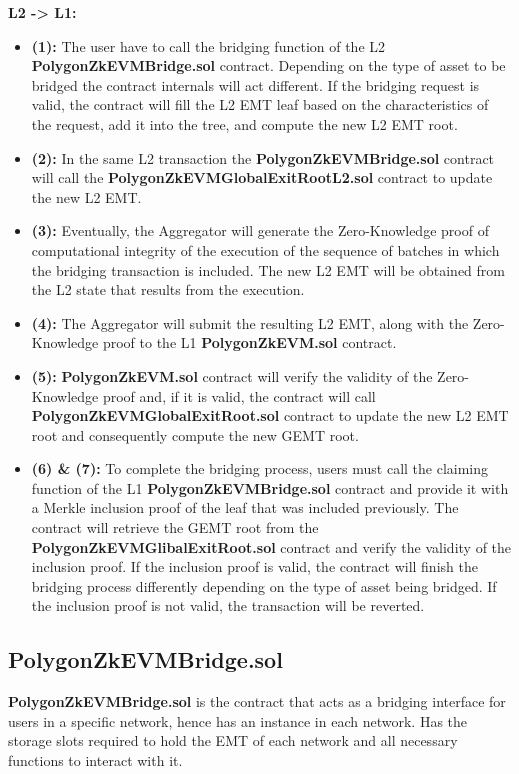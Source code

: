 \textbf{L2 -> L1:}
\begin{itemize}
	\item \textbf{(1):} The user have to call the bridging function of the L2 \textbf{PolygonZkEVMBridge.sol} contract. Depending on the type of asset to be bridged the contract internals will act different. If the bridging request is valid, the contract will fill the L2 EMT leaf based on the characteristics of the request, add it into the tree, and compute the new L2 EMT root.
	\item \textbf{(2):} In the same L2 transaction the \textbf{PolygonZkEVMBridge.sol} contract will call the \textbf{PolygonZkEVMGlobalExitRootL2.sol} contract to update the new L2 EMT.
	\item \textbf{(3):} Eventually, the Aggregator will generate the Zero-Knowledge proof of computational integrity of the execution of the sequence of batches in which the bridging transaction is included. The new L2 EMT will be obtained from the L2 state that results from the execution.
	\item \textbf{(4):} The Aggregator will submit the resulting L2 EMT, along with the Zero-Knowledge proof to the L1 \textbf{PolygonZkEVM.sol} contract.
	\item \textbf{(5):} \textbf{PolygonZkEVM.sol} contract will verify the validity of the Zero-Knowledge proof and, if it is valid, the contract will call \textbf{PolygonZkEVMGlobalExitRoot.sol} contract to update the new L2 EMT root and consequently compute the new GEMT root.
	\item \textbf{(6) \& (7):} To complete the bridging process, users must call the claiming function of the L1 \textbf{PolygonZkEVMBridge.sol} contract and provide it with a Merkle inclusion proof of the leaf that was included previously. The contract will retrieve the GEMT root from the \textbf{PolygonZkEVMGlibalExitRoot.sol} contract and verify the validity of the inclusion proof. If the inclusion proof is valid, the contract will finish the bridging process differently depending on the type of asset being bridged. If the inclusion proof is not valid, the transaction will be reverted.
\end{itemize}



\subsection{PolygonZkEVMBridge.sol}


\textbf{PolygonZkEVMBridge.sol} is the contract that acts as a bridging interface for users in a specific network, hence has an instance in each network. Has the storage slots required to hold the EMT of each network and all necessary functions to interact with it.
